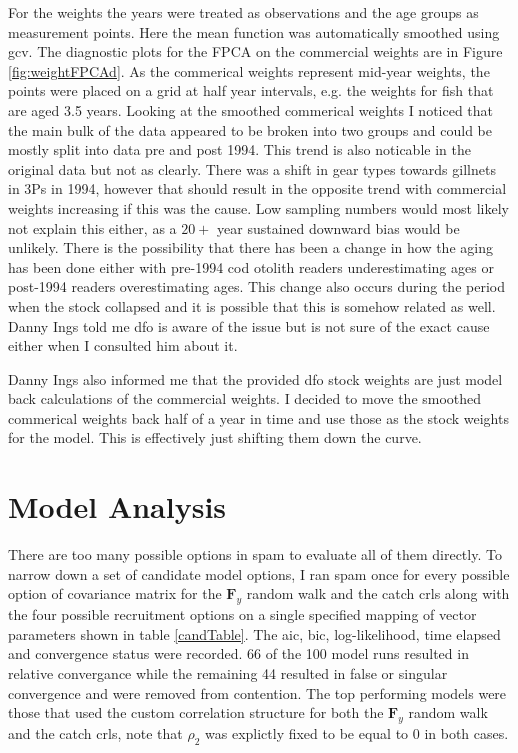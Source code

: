 \documentclass[11pt]{article}\usepackage[]{graphicx}\usepackage[]{color}
\begin{document}
For the weights the years were treated as observations and the age groups as measurement points. Here the mean function was automatically smoothed using \acrfull{gcv}. The diagnostic plots for the FPCA on the commercial weights are in Figure \ref{fig:weightFPCAd}. As the commerical weights represent mid-year weights, the points were placed on a grid at half year intervals, e.g. the weights for fish that are aged 3.5 years. Looking at the smoothed commerical weights I noticed that the main bulk of the data appeared to be broken into two groups and could be mostly split into data pre and post 1994. This trend is also noticable in the original data but not as clearly. There was a shift in gear types towards gillnets in 3Ps in 1994, however that should result in the opposite trend with commercial weights increasing if this was the cause. Low sampling numbers would most likely not explain this either, as a $20+$ year sustained downward bias would be unlikely. There is the possibility that there has been a change in how the aging has been done either with pre-1994 cod otolith readers underestimating ages or post-1994 readers overestimating ages. This change also occurs during the period when the stock collapsed and it is possible that this is somehow related as well. Danny Ings told me \acrshort{dfo} is aware of the issue but is not sure of the exact cause either when I consulted him about it.  


Danny Ings also informed me that the provided \acrshort{dfo} stock weights are just model back calculations of the commercial weights. I decided to move the smoothed commerical weights back half of a year in time and use those as the stock weights for the model. This is effectively just shifting them down the curve. 

\section{Model Analysis}



There are too many possible options in \acrshort{spam} to evaluate all of them directly. To narrow down a set of candidate model options, I ran \acrshort{spam} once for every possible option of covariance matrix for the $\bm{F}_y$ random walk and the catch \acrshort{crl}s along with the four possible recruitment options on a single specified mapping of vector parameters shown in table \ref{candTable}. The \acrfull{aic}, \acrfull{bic}, log-likelihood, time elapsed and convergence status were recorded. 66 of the 100 model runs resulted in relative convergance while the remaining 44 resulted in false or singular convergence and were removed from contention. The top performing models were those that used the custom correlation structure for both the $\bm{F}_y$ random walk and the catch \acrshort{crl}s, note that $\rho_2$ was explictly fixed to be equal to 0 in both cases.
\end{document}

